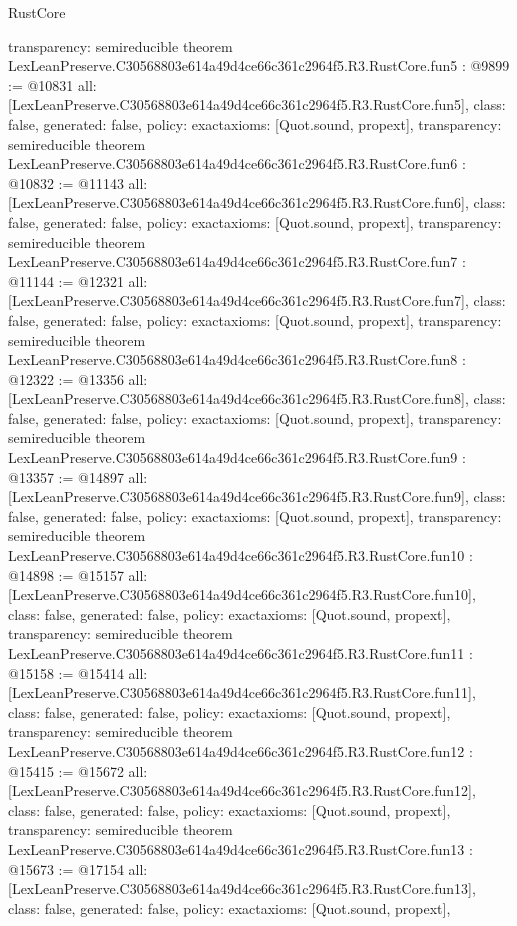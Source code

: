 \begin{lexlean}{RustCore}
\begin{coremodule}
{  transparency: semireducible
}
theorem LexLeanPreserve.C30568803e614a49d4ce66c361c2964f5.R3.RustCore.fun5 : @9899 := @10831 {
  all: [LexLeanPreserve.C30568803e614a49d4ce66c361c2964f5.R3.RustCore.fun5],
  class: false,
  generated: false,
  policy: exact{axioms: [Quot.sound, propext]},
  transparency: semireducible
}
theorem LexLeanPreserve.C30568803e614a49d4ce66c361c2964f5.R3.RustCore.fun6 : @10832 := @11143 {
  all: [LexLeanPreserve.C30568803e614a49d4ce66c361c2964f5.R3.RustCore.fun6],
  class: false,
  generated: false,
  policy: exact{axioms: [Quot.sound, propext]},
  transparency: semireducible
}
theorem LexLeanPreserve.C30568803e614a49d4ce66c361c2964f5.R3.RustCore.fun7 : @11144 := @12321 {
  all: [LexLeanPreserve.C30568803e614a49d4ce66c361c2964f5.R3.RustCore.fun7],
  class: false,
  generated: false,
  policy: exact{axioms: [Quot.sound, propext]},
  transparency: semireducible
}
theorem LexLeanPreserve.C30568803e614a49d4ce66c361c2964f5.R3.RustCore.fun8 : @12322 := @13356 {
  all: [LexLeanPreserve.C30568803e614a49d4ce66c361c2964f5.R3.RustCore.fun8],
  class: false,
  generated: false,
  policy: exact{axioms: [Quot.sound, propext]},
  transparency: semireducible
}
theorem LexLeanPreserve.C30568803e614a49d4ce66c361c2964f5.R3.RustCore.fun9 : @13357 := @14897 {
  all: [LexLeanPreserve.C30568803e614a49d4ce66c361c2964f5.R3.RustCore.fun9],
  class: false,
  generated: false,
  policy: exact{axioms: [Quot.sound, propext]},
  transparency: semireducible
}
theorem LexLeanPreserve.C30568803e614a49d4ce66c361c2964f5.R3.RustCore.fun10 : @14898 := @15157 {
  all: [LexLeanPreserve.C30568803e614a49d4ce66c361c2964f5.R3.RustCore.fun10],
  class: false,
  generated: false,
  policy: exact{axioms: [Quot.sound, propext]},
  transparency: semireducible
}
theorem LexLeanPreserve.C30568803e614a49d4ce66c361c2964f5.R3.RustCore.fun11 : @15158 := @15414 {
  all: [LexLeanPreserve.C30568803e614a49d4ce66c361c2964f5.R3.RustCore.fun11],
  class: false,
  generated: false,
  policy: exact{axioms: [Quot.sound, propext]},
  transparency: semireducible
}
theorem LexLeanPreserve.C30568803e614a49d4ce66c361c2964f5.R3.RustCore.fun12 : @15415 := @15672 {
  all: [LexLeanPreserve.C30568803e614a49d4ce66c361c2964f5.R3.RustCore.fun12],
  class: false,
  generated: false,
  policy: exact{axioms: [Quot.sound, propext]},
  transparency: semireducible
}
theorem LexLeanPreserve.C30568803e614a49d4ce66c361c2964f5.R3.RustCore.fun13 : @15673 := @17154 {
  all: [LexLeanPreserve.C30568803e614a49d4ce66c361c2964f5.R3.RustCore.fun13],
  class: false,
  generated: false,
  policy: exact{axioms: [Quot.sound, propext]},
}
\end{coremodule}
\end{lexlean}

